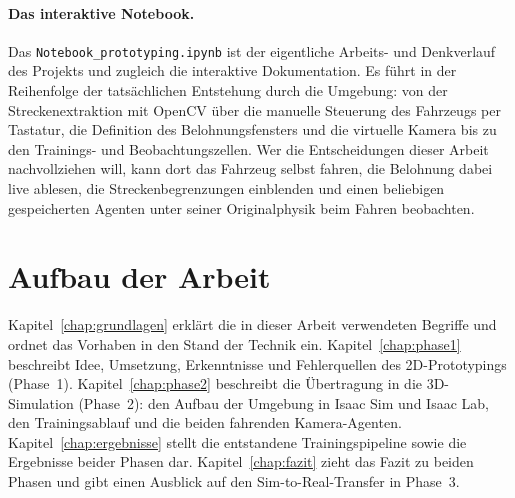 \paragraph{Das interaktive Notebook.}
Das \texttt{Notebook\_prototyping.ipynb} ist der eigentliche Arbeits- und Denkverlauf des Projekts und zugleich die interaktive Dokumentation. Es führt in der Reihenfolge der tatsächlichen Entstehung durch die Umgebung: von der Streckenextraktion mit OpenCV über die manuelle Steuerung des Fahrzeugs per Tastatur, die Definition des Belohnungsfensters und die virtuelle Kamera bis zu den Trainings- und Beobachtungszellen. Wer die Entscheidungen dieser Arbeit nachvollziehen will, kann dort das Fahrzeug selbst fahren, die Belohnung dabei live ablesen, die Streckenbegrenzungen einblenden und einen beliebigen gespeicherten Agenten unter seiner Originalphysik beim Fahren beobachten.

\section{Aufbau der Arbeit}

Kapitel~\ref{chap:grundlagen} erklärt die in dieser Arbeit verwendeten Begriffe und ordnet das Vorhaben in den Stand der Technik ein. Kapitel~\ref{chap:phase1} beschreibt Idee, Umsetzung, Erkenntnisse und Fehlerquellen des 2D-Prototypings (Phase~1). Kapitel~\ref{chap:phase2} beschreibt die Übertragung in die 3D-Simulation (Phase~2): den Aufbau der Umgebung in Isaac Sim und Isaac Lab, den Trainingsablauf und die beiden fahrenden Kamera-Agenten. Kapitel~\ref{chap:ergebnisse} stellt die entstandene Trainingspipeline sowie die Ergebnisse beider Phasen dar. Kapitel~\ref{chap:fazit} zieht das Fazit zu beiden Phasen und gibt einen Ausblick auf den Sim-to-Real-Transfer in Phase~3.
